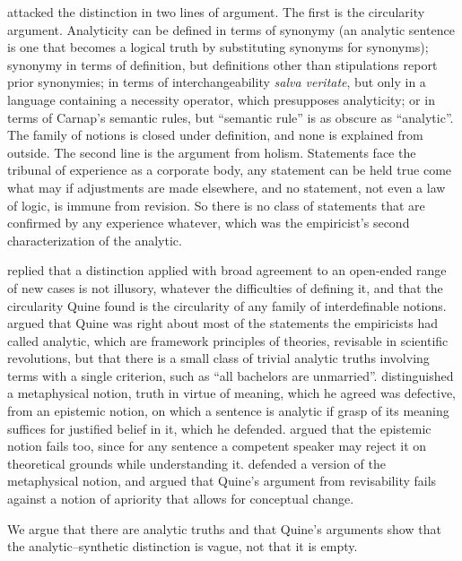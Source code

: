 \documentclass{situationist-preprint}
\begin{document}
\citet{Quine1951} attacked the distinction in two lines of argument. The first is the circularity argument. Analyticity can be defined in terms of synonymy (an analytic sentence is one that becomes a logical truth by substituting synonyms for synonyms); synonymy in terms of definition, but definitions other than stipulations report prior synonymies; in terms of interchangeability \emph{salva veritate}, but only in a language containing a necessity operator, which presupposes analyticity; or in terms of Carnap's semantic rules, but \enquote{semantic rule} is as obscure as \enquote{analytic}. The family of notions is closed under definition, and none is explained from outside. The second line is the argument from holism. Statements face the tribunal of experience as a corporate body, any statement can be held true come what may if adjustments are made elsewhere, and no statement, not even a law of logic, is immune from revision. So there is no class of statements that are confirmed by any experience whatever, which was the empiricist's second characterization of the analytic.

\citet{GriceStrawson1956} replied that a distinction applied with broad agreement to an open-ended range of new cases is not illusory, whatever the difficulties of defining it, and that the circularity Quine found is the circularity of any family of interdefinable notions. \citet{Putnam1962} argued that Quine was right about most of the statements the empiricists had called analytic, which are framework principles of theories, revisable in scientific revolutions, but that there is a small class of trivial analytic truths involving terms with a single criterion, such as \enquote{all bachelors are unmarried}. \citet{Boghossian1996} distinguished a metaphysical notion, truth in virtue of meaning, which he agreed was defective, from an epistemic notion, on which a sentence is analytic if grasp of its meaning suffices for justified belief in it, which he defended. \citet{Williamson2007} argued that the epistemic notion fails too, since for any sentence a competent speaker may reject it on theoretical grounds while understanding it. \citet{Russell2008} defended a version of the metaphysical notion, and \citet{Chalmers2011} argued that Quine's argument from revisability fails against a notion of apriority that allows for conceptual change.

We argue that there are analytic truths and that Quine's arguments show that the analytic--synthetic distinction is vague, not that it is empty.
\end{document}
